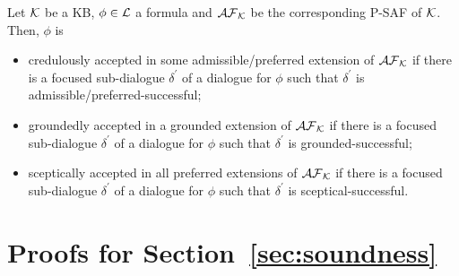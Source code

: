 
     
    

\begin{corollary} 
\label{cor:analogous-Cor1}
Let $\mathcal{K}$ be a KB, $\phi \in \mathcal{L}$ a formula and $\mathcal{AF}_{\mathcal{K}}$ be the corresponding P-SAF of $\mathcal{K}$. Then, $\phi$ is
\begin{itemize}
    \item   credulously accepted in some admissible/preferred extension of $\mathcal{AF}_{\mathcal{K}}$ if there is a focused sub-dialogue $\delta^{\prime}$ of a dialogue for $\phi$ such that $\delta^{\prime}$ is admissible/preferred-successful;
    
    \item groundedly accepted in a grounded extension of $\mathcal{AF}_{\mathcal{K}}$ if there is a focused sub-dialogue $\delta^{\prime}$ of a dialogue for $\phi$  such that $\delta^{\prime}$ is grounded-successful;

    \item  sceptically accepted in all preferred extensions of $\mathcal{AF}_{\mathcal{K}}$ if there is a focused sub-dialogue $\delta^{\prime}$ of a dialogue for $\phi$ such that $\delta^{\prime}$ is sceptical-successful.   
\end{itemize} 
\end{corollary}


\section{Proofs for Section~\ref{sec:soundness}} 
\label{app:proof-soundness}

